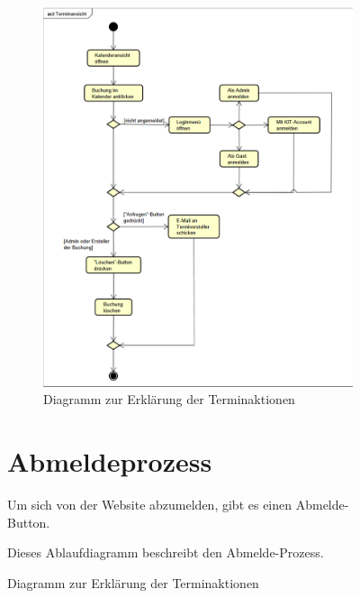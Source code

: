 \begin{figure}[ht]
\begin{figure}[ht]
    \centering
    \includegraphics[width=\textwidth]{figures/activity/terminansicht}
    \caption{Diagramm zur Erklärung der Terminaktionen}
    \label{fig:booking-actions-diagram}
\end{figure}
\clearpage

\section{Abmeldeprozess}

Um sich von der Website abzumelden, gibt es einen Abmelde-Button.

Dieses Ablaufdiagramm beschreibt den Abmelde-Prozess.


\end{figure}
